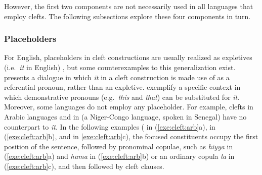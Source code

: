 \noindent However, the first two components are not necessarily used
in all languages that employ clefts. The following subsections explore
these four components in turn.



\subsubsection{Placeholders}
\label{10:sssec:clefts:placeholders}


For English, placeholders in cleft constructions are
usually realized as expletives (i.e.\ \textit{it} in English)
\citep{pollard:sag:94}, but some counterexamples to this
generalization exist. \citet{kim:12a} presents a dialogue in which
\textit{it} in a cleft construction is made use of as a referential
pronoun, rather than an expletive. \citet{ han:hedberg:08} exemplify a
specific context in which demonstrative pronouns (e.g.\ \textit{this}
and \textit{that}) can be substituted for \textit{it}. Moreover, some
languages do not employ any placeholder. For example, clefts in Arabic
languages and in  (a Niger-Congo language, spoken in
Senegal) have no counterpart to \textit{it}. In the following examples
( in (\ref{exe:cleft:arb}a),  in (\ref{exe:cleft:arb}b), and  in
\ref{exe:cleft:arb}c), the focused constituents occupy the first
position of the sentence, followed by pronominal copulae, such as
\textit{hiyya} in (\ref{exe:cleft:arb}a) and \textit{huma} in
(\ref{exe:cleft:arb}b) or an ordinary copula \textit{la} in
(\ref{exe:cleft:arb}c), and then followed by cleft clauses.




